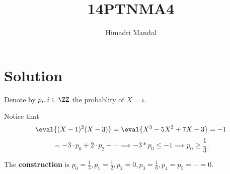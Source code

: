 \documentclass[11pt]{scrartcl}
\title{14PTNMA4}
\author{Himadri Mandal}
\begin{document}
\maketitle

\section{Solution}
\begin{soln}

\raggedright
Denote by $p_i, i \in \ZZ$ the probablity of $X = i$. 

Notice that 
$$\eval{(X-1)^2(X-3)} = \eval{X^3-5X^2+7X-3} = -1$$ $$= -3 \cdot p_0 + 2 \cdot p_2 + \cdots \implies -3 * p_0 \leq -1 \implies p_0 \geq \frac13.$$

The \textbf{construction} is $p_0 = \frac13, p_1 = \frac12, p_2 = 0, p_3=\frac16, p_4 = p_5 = \cdots = 0$. 

\end{soln}
\end{document}
